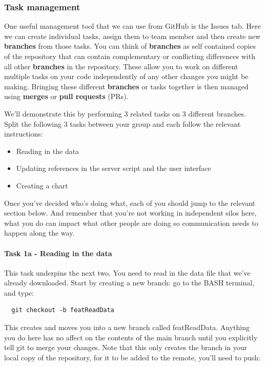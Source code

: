 \documentclass[
  12pt,
]{article}
\providecommand{\tightlist}{%
  \setlength{\itemsep}{0pt}\setlength{\parskip}{0pt}}
\begin{document}
\hypertarget{task-management}{%
\subsubsection{Task management}\label{task-management}}

One useful management tool that we can use from GitHub is the Issues
tab. Here we can create individual tasks, assign them to team member and
then create new \textbf{branches} from those tasks. You can think of
\textbf{branches} as self contained copies of the repository that can
contain complementary or conflicting differences with all other
\textbf{branches} in the repository. These allow you to work on
different multiple tasks on your code independently of any other changes
you might be making. Bringing these different \textbf{branches} or tasks
together is then managed using \textbf{merges} or \textbf{pull requests}
(PRs).

We'll demonstrate this by performing 3 related tasks on 3 different
branches. Split the following 3 tasks between your group and each follow
the relevant instructions:

\begin{itemize}
\tightlist
\item
  Reading in the data
\item
  Updating references in the server script and the user interface
\item
  Creating a chart
\end{itemize}

Once you've decided who's doing what, each of you should jump to the
relevant section below. And remember that you're not working in
independent silos here, what you do can impact what other people are
doing so communication needs to happen along the way.

\hypertarget{task-1a---reading-in-the-data}{%
\paragraph{Task 1a - Reading in the
data}\label{task-1a---reading-in-the-data}}

This task underpins the next two. You need to read in the data file that
we've already downloaded. Start by creating a new branch: go to the BASH
terminal, and type:

\begin{verbatim}
  git checkout -b featReadData
\end{verbatim}

This creates and moves you into a new branch called featReadData.
Anything you do here has no affect on the contents of the main branch
until you explicitly tell git to merge your changes. Note that this only
creates the branch in your local copy of the repository, for it to be
added to the remote, you'll need to push:
\end{document}
